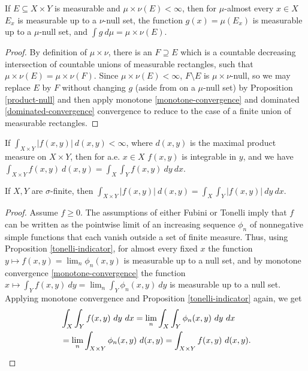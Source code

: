 \documentclass[letterpaper,11pt]{report}
\begin{document}
\begin{prop}\label{tonelli-indicator} If $E \subseteq X\times Y$ is measurable and $\mu\times\nu(E) < \infty$, then for $\mu$-almost every $x \in X$ $E_x$ is measurable up to a $\nu$-null set, the function $g(x) = \mu(E_x)$ is measurable up to a $\mu$-null set, and $\int g\ d\mu = \mu\times\nu(E)$.
\end{prop}
\begin{proof} By definition of $\mu\times\nu$, there is an $F \supseteq E$ which is a countable decreasing intersection of countable unions of measurable rectangles, such that $\mu\times\nu(E) = \mu\times\nu(F)$. Since $\mu\times\nu(E) < \infty$, $F\setminus E$ is $\mu\times\nu$-null, so we may replace $E$ by $F$ without changing $g$ (aside from on a $\mu$-null set) by Proposition \ref{product-null} and then apply monotone \ref{monotone-convergence} and dominated \ref{dominated-convergence} convergence to reduce to the case of a finite union of measurable rectangles.
\end{proof}

\begin{thm}\label{fubini} If $\int_{X\times Y} |f(x,y)|\ d(x,y) < \infty$, where $d(x,y)$ is the maximal product measure on $X\times Y$, then for a.e. $x\in X$ $f(x,y)$ is integrable in $y$, and we have $\int_{X\times Y} f(x,y)\ d(x,y) = \int_X \int_Y f(x,y)\ dy\ dx$.
\end{thm}

\begin{thm}\label{tonelli} If $X,Y$ are $\sigma$-finite, then $\int_{X\times Y} |f(x,y)|\ d(x,y) = \int_X \int_Y |f(x,y)|\ dy\ dx$.
\end{thm}
\begin{proof} Assume $f \ge 0$. The assumptions of either Fubini or Tonelli imply that $f$ can be written as the pointwise limit of an increasing sequence $\phi_n$ of nonnegative simple functions that each vanish outside a set of finite measure. Thus, using Proposition \ref{tonelli-indicator}, for almost every fixed $x$ the function $y\mapsto f(x,y) = \lim_n \phi_n(x,y)$ is measurable up to a null set, and by monotone convergence \ref{monotone-convergence} the function $x \mapsto \int_Y f(x,y)\ dy = \lim_n \int_Y \phi_n(x,y)\ dy$ is measurable up to a null set. Applying monotone convergence and Proposition \ref{tonelli-indicator} again, we get
\begin{align*}
&\int_X\int_Yf(x,y)\ dy\ dx = \lim_n \int_X\int_Y\phi_n(x,y)\ dy\ dx\\
&= \lim_n \int_{X\times Y}\phi_n(x,y)\ d(x,y) = \int_{X\times Y}f(x,y)\ d(x,y).\qedhere
\end{align*}
\end{proof}
\end{document}
